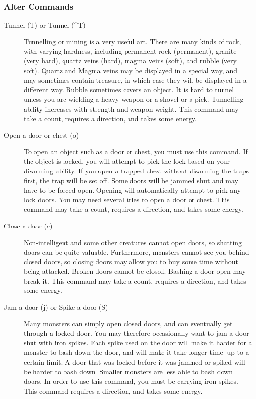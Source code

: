 \subsubsection{Alter Commands}
\begin{description}
\item[Tunnel (T) or Tunnel (\^{}T)]
  Tunnelling or mining is a very useful art. There are many kinds of rock,
  with varying hardness, including permanent rock (permanent), granite
  (very hard), quartz veins (hard), magma veins (soft), and rubble (very
  soft). Quartz and Magma veins may be displayed in a special way, and may
  sometimes contain treasure, in which case they will be displayed in a
  different way. Rubble sometimes covers an object. It is hard to tunnel
  unless you are wielding a heavy weapon or a shovel or a pick. Tunnelling
  ability increases with strength and weapon weight. This command may take
  a count, requires a direction, and takes some energy.

\item[Open a door or chest (o)] To open an object such as a door or chest,
  you must use this command. If the object is locked, you will attempt to
  pick the lock based on your disarming ability.  If you open a trapped
  chest without disarming the traps first, the trap will be set off. Some
  doors will be jammed shut and may have to be forced open. Opening will
  automatically attempt to pick any lock doors. You may need several tries
  to open a door or chest. This command may take a count, requires a
  direction, and takes some energy.

\item[Close a door (c)] Non-intelligent and some other creatures cannot
  open doors, so shutting doors can be quite valuable.  Furthermore,
  monsters cannot see you behind closed doors, so closing doors may allow
  you to buy some time without being attacked. Broken doors cannot be
  closed.  Bashing a door open may break it. This command may take a
  count, requires a direction, and takes some energy.

\item[Jam a door (j) or Spike a door (S)]
  Many monsters can simply open closed doors, and can eventually get
  through a locked door.  You may therefore occasionally want to jam a
  door shut with iron spikes.  Each spike used on the door will make it
  harder for a monster to bash down the door, and will make it take longer
  time, up to a certain limit.  A door that was locked before it was
  jammed or spiked will be harder to bash down.  Smaller monsters are less
  able to bash down doors.  In order to use this command, you must be
  carrying iron spikes.  This command requires a direction, and takes some
  energy.


\end{description}
